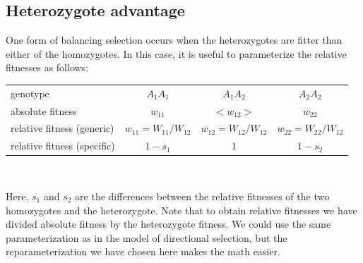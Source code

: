 \subsection{Heterozygote advantage}
One form of balancing selection occurs when the heterozygotes are fitter than either
of the homozygotes. In this case, it is useful to parameterize the relative fitnesses as follows:\\
\begin{center}
\begin{tabular}{lccc}
	genotype & $A_1A_1$ & $A_1A_2$ & $A_2A_2$ \\
	absolute fitness & $w_{11}$ & $<w_{12}>$ & $w_{22}$ \\
	relative fitness (generic) & $w_{11}=W_{11}/W_{12}$ & $w_{12} = W_{12}/W_{12}$ & $w_{22} = W_{22}/W_{12}$ \\
	relative fitness (specific)  & $1-s_1$ & $1$ & $1-s_2$ \\
\end{tabular}\\
\end{center}

Here, $s_1$ and $s_2$ are the differences between the relative fitnesses
of the two homozygotes and the heterozygote. Note that to obtain
relative fitnesses we have divided
absolute fitness by the heterozygote fitness. We could use the
same parameterization as in the model of directional selection, but
the reparameterization we have chosen here makes the math easier.\\


